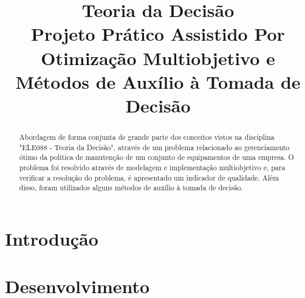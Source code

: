 \documentclass[conference]{IEEEtran}
\begin{document}
\title{Teoria da Decisão\\Projeto Prático Assistido Por Otimização Multiobjetivo e Métodos de Auxílio à Tomada de Decisão}


\author{
	\and
	
	\and
	

}

\maketitle

\begin{abstract}
Abordagem de forma conjunta de grande parte dos conceitos vistos na disciplina "ELE088 - Teoria da Decisão", através de um problema relacionado ao gerenciamento ótimo da política de manutenção de um conjunto de equipamentos de uma empresa. O problema foi resolvido através de modelagem e implementação multiobjetivo e, para verificar a resolução do problema, é apresentado um indicador de qualidade. Além disso, foram utilizados alguns métodos de auxílio à tomada de decisão.
\end{abstract}

\IEEEpeerreviewmaketitle

\section{Introdução}


\section{Desenvolvimento}
\end{document}
